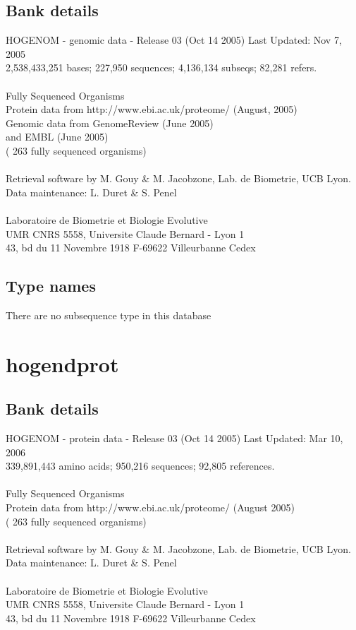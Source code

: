 \documentclass{article}
\begin{document}
\begin{Schunk}
\subsection{Bank details}
HOGENOM - genomic data - Release 03 (Oct 14 2005) Last Updated: Nov  7, 2005\\
2,538,433,251 bases; 227,950 sequences; 4,136,134 subseqs; 82,281 refers.\\
\\
Fully Sequenced Organisms\\
Protein data from http://www.ebi.ac.uk/proteome/ (August, 2005)\\
Genomic data from GenomeReview  (June 2005)\\
and  EMBL (June 2005)\\
( 263 fully sequenced organisms)\\
\\
Retrieval software by M. Gouy \& M. Jacobzone, Lab. de Biometrie, UCB Lyon.\\
Data maintenance: L. Duret \& S. Penel\\
\\
Laboratoire de Biometrie et Biologie Evolutive\\
UMR CNRS 5558, Universite Claude Bernard - Lyon 1\\
43, bd du 11 Novembre 1918 F-69622 Villeurbanne Cedex\\


\subsection{Type names}
There are no subsequence type in this database
\section{ hogendprot }
\subsection{Bank details}
HOGENOM - protein data - Release 03 (Oct 14 2005) Last Updated: Mar 10, 2006\\
339,891,443 amino acids; 950,216 sequences; 92,805 references.\\
\\
Fully Sequenced Organisms\\
Protein data from http://www.ebi.ac.uk/proteome/ (August 2005)\\
( 263 fully sequenced organisms)\\
\\
Retrieval software by M. Gouy \& M. Jacobzone, Lab. de Biometrie, UCB Lyon.\\
Data maintenance: L. Duret \& S. Penel\\
\\
Laboratoire de Biometrie et Biologie Evolutive\\
UMR CNRS 5558, Universite Claude Bernard - Lyon 1\\
43, bd du 11 Novembre 1918 F-69622 Villeurbanne Cedex\\



\end{Schunk}
\end{document}
